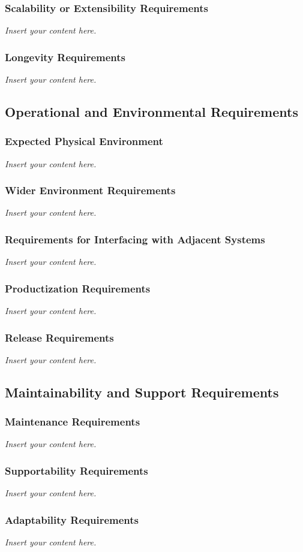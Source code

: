 \documentclass[12pt]{article}
\newcommand{\lips}{\textit{Insert your content here.}}
\begin{document}
\subsubsection{Scalability or Extensibility Requirements}
\lips
\subsubsection{Longevity Requirements}
\lips

\subsection{Operational and Environmental Requirements}
\subsubsection{Expected Physical Environment}
\lips
\subsubsection{Wider Environment Requirements}
\lips
\subsubsection{Requirements for Interfacing with Adjacent Systems}
\lips
\subsubsection{Productization Requirements}
\lips
\subsubsection{Release Requirements}
\lips

\subsection{Maintainability and Support Requirements}
\subsubsection{Maintenance Requirements}
\lips
\subsubsection{Supportability Requirements}
\lips
\subsubsection{Adaptability Requirements}
\lips
\end{document}
